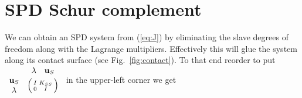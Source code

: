 \documentclass[11pt]{article}
\newcommand{\vecu}{{\bf u}}
\begin{document}
\section{SPD Schur complement}
We can obtain an SPD system from (\ref{eq:J}) by eliminating the slave degrees of freedom along with the Lagrange multipliers.
Effectively this will glue the system along its contact surface (see Fig.~\ref{fig:contact}).
To that end reorder to put
$\begin{array}{lc}
& \begin{matrix}\lambda&\vecu_S\end{matrix}\\
\begin{matrix}\vecu_S\\ \lambda \end{matrix} & \Bigl(\begin{smallmatrix} I & K_{SS}\\ 0 & I \end{smallmatrix}\Bigr)
\end{array}
$
in the upper-left corner we get
\end{document}
